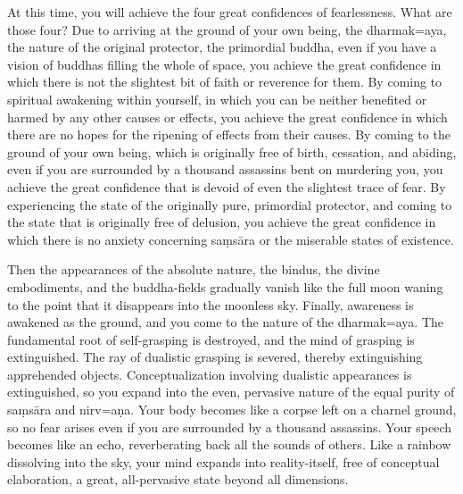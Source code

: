\documentclass[11pt,twocolumn]{article}
\begin{document}
At this time, you will achieve the four great confidences of
fearlessness. What are those four? Due to arriving at the ground of
your own being, the dharmak\a={a}ya, the nature of the original
protector, the primordial buddha, even if you have a vision of buddhas
filling the whole of space, you achieve the great confidence in which
there is not the slightest bit of faith or reverence for them. By
coming to spiritual awakening within yourself, in which you can be
neither benefited or harmed by any other causes or effects, you
achieve the great confidence in which there are no hopes for the
ripening of effects from their causes. By coming to the ground of your
own being, which is originally free of birth, cessation, and abiding,
even if you are surrounded by a thousand assassins bent on murdering
you, you achieve the great confidence that is devoid of even the
slightest trace of fear. By experiencing the state of the originally
pure, primordial protector, and coming to the state that is originally
free of delusion, you achieve the great confidence in which there is
no anxiety concerning sa\d{m}s\={a}ra or the miserable states of
existence.

Then the appearances of the absolute nature, the bindus, the divine
embodiments, and the buddha\hyp{}fields gradually vanish like the full
moon waning to the point that it disappears into the moonless
sky. Finally, awareness is awakened as the ground, and you come to the
nature of the dharmak\a={a}ya. The fundamental root of
self\hyp{}grasping is destroyed, and the mind of grasping is
extinguished. The ray of dualistic grasping is severed, thereby
extinguishing apprehended objects. Conceptualization involving
dualistic appearances is extinguished, so you expand into the even,
pervasive nature of the equal purity of sa\d{m}s\={a}ra and
nirv\a={a}\d{n}a. Your body becomes like a corpse left on a charnel
ground, so no fear arises even if you are surrounded by a thousand
assassins. Your speech becomes like an echo, reverberating back all
the sounds of others. Like a rainbow dissolving into the sky, your
mind expands into reality\hyp{}itself, free of conceptual elaboration,
a great, all\hyp{}pervasive state beyond all dimensions.
\end{document}
